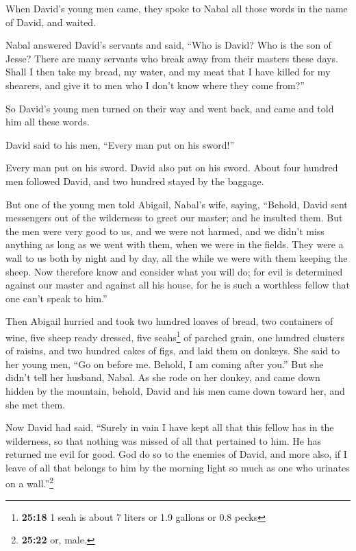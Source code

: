  When David's young men came, they spoke to Nabal all
those words in the name of David, and waited.

 Nabal answered David's servants and said, ``Who is
David? Who is the son of Jesse? There are many servants who break away
from their masters these days.  Shall I then take my
bread, my water, and my meat that I have killed for my shearers, and
give it to men who I don't know where they come from?''

 So David's young men turned on their way and went back,
and came and told him all these words.

 David said to his men, ``Every man put on his sword!''

Every man put on his sword. David also put on his sword. About four
hundred men followed David, and two hundred stayed by the baggage.

 But one of the young men told Abigail, Nabal's wife,
saying, ``Behold, David sent messengers out of the wilderness to greet
our master; and he insulted them.  But the men were very
good to us, and we were not harmed, and we didn't miss anything as long
as we went with them, when we were in the fields.  They
were a wall to us both by night and by day, all the while we were with
them keeping the sheep.  Now therefore know and consider
what you will do; for evil is determined against our master and against
all his house, for he is such a worthless fellow that one can't speak to
him.''

 Then Abigail hurried and took two hundred loaves of
bread, two containers of wine, five sheep ready dressed, five
seahs\footnote{\textbf{25:18} 1 seah is about 7 liters or 1.9 gallons or
  0.8 pecks} of parched grain, one hundred clusters of raisins, and two
hundred cakes of figs, and laid them on donkeys.  She
said to her young men, ``Go on before me. Behold, I am coming after
you.'' But she didn't tell her husband, Nabal.  As she
rode on her donkey, and came down hidden by the mountain, behold, David
and his men came down toward her, and she met them.

 Now David had said, ``Surely in vain I have kept all
that this fellow has in the wilderness, so that nothing was missed of
all that pertained to him. He has returned me evil for good.
 God do so to the enemies of David, and more also, if I
leave of all that belongs to him by the morning light so much as one who
urinates on a wall.''\footnote{\textbf{25:22} or, male.}

